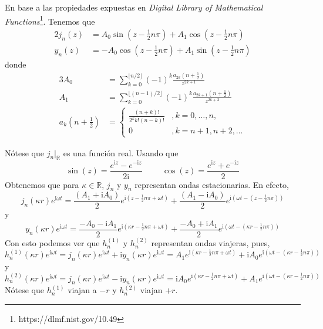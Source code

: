 \documentclass[11pt]{article}
\numberwithin{equation}{section}
\def\R{\mathbb{R}}
\let\i\relax
\def\i{\mathrm{i}}
\begin{document}
En base a las propiedades expuestas en \textit{Digital Library of Mathematical
Functions}\footnote{https://dlmf.nist.gov/10.49}. Tenemos que
\begin{alignat*}{2}
	j_n(z)
	&=
	A_0 \sin(z - \frac{1}{2} n \pi) 
	+
	A_1 \cos(z - \frac{1}{2} n \pi)
	\\
	y_n(z)
	&=
	- A_0 \cos(z - \frac{1}{2} n \pi)
	+ A_1 \sin(z - \frac{1}{2} n \pi)
\end{alignat*}
donde 
\begin{alignat*}{3}
	A_0 &= 
	\sum_{k=0}^{\lfloor n/2 \rfloor} 
		(-1)^k \frac{a_{2k} (n + \frac{1}{2}) }{z^{2k + 1}}  
	\\
	A_1 &=
	\sum_{k=0}^{\lfloor (n-1)/2 \rfloor}
		(-1)^k \frac{a_{2k+1}(n + \frac{1}{2}) }{z^{2k+2}} 
	\\
	a_k (n + \frac{1}{2})
	&=
	\begin{cases}
		\frac{(n+k)!}{2^k k! (n-k)!} &, k=0,\dots, n, \\
		0 &, k=n+1, n+2, \dots
	\end{cases}
\end{alignat*}

Nótese que \(j_n \vert_{\R}\) es una función real. Usando que 
\begin{displaymath}
	\sin(z) = \frac{e^{\i z} - e^{-\i z}}{2 \i}
	\hspace{1cm}
	\cos(z) = \frac{e^{\i z} + e^{-\i z}}{2} 
\end{displaymath}
Obtenemos que para \(\kappa\in \R\), \(j_n\) y \(y_n\) representan ondas
estacionarias. En efecto,
\begin{displaymath}
	j_n(\kappa r) e^{\i \omega t}
	=
	\frac{(A_1 + \i A_0)}{2} e^{\i (z - \frac{1}{2} n \pi + \omega t)}
	+
	\frac{(A_1 - \i A_0)}{2} e^{\i (\omega t - (z - \frac{1}{2} n \pi))}
\end{displaymath}
y
\begin{displaymath}
	y_n(\kappa r) e^{\i \omega t}
	=
	\frac{-A_0 - \i A_1}{2} e^{\i (\kappa r - \frac{1}{2} n \pi + \omega t)}
	+
	\frac{-A_0 + \i A_1}{2} e^{\i (\omega t - (\kappa r - \frac{1}{2} n \pi))} 
\end{displaymath}
Con esto podemos ver que \(h^{(1)}_n\) y \(h^{(2)}_n\) representan ondas
viajeras, pues,
\begin{displaymath}
	h^{(1)}_n(\kappa r) e^{\i \omega t}
	=
	j_n(\kappa r) e^{\i \omega t}
	+
	\i y_n(\kappa r) e^{\i \omega t}
	=
	A_1 e^{\i (\kappa r - \frac{1}{2} n \pi + \omega t)}
	+
	\i A_0 e^{\i (\omega t - (\kappa r - \frac{1}{2} n \pi))}
\end{displaymath}
y
\begin{displaymath}
	h^{(2)}_n(\kappa r) e^{\i \omega t}
	=
	j_n(\kappa r) e^{\i \omega t}
	-
	\i y_n(\kappa r) e^{\i \omega t}
	=
	\i A_0 e^{\i (\kappa r - \frac{1}{2} n \pi + \omega t)}
	+
	A_1 e^{\i (\omega t - (\kappa r - \frac{1}{2} n \pi))}
\end{displaymath}
Nótese que \(h^{(1)}_n\) viajan a \(-r\) y \(h^{(2)}_n\) viajan \(+r\).
\end{document}
